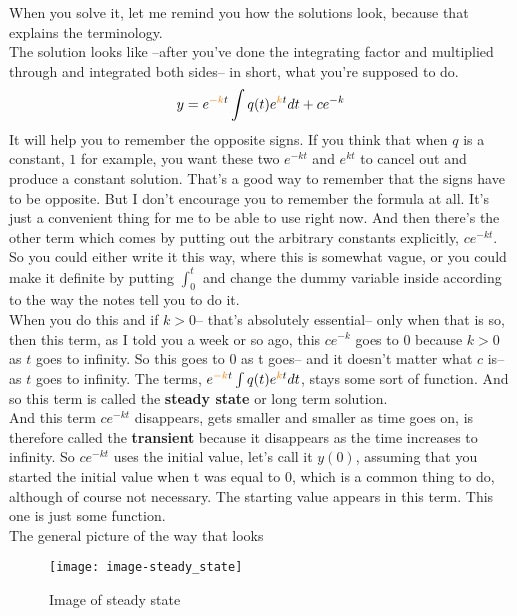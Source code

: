 When you solve it, let me remind you how the solutions look,
because that explains the terminology. \\
The solution looks like
--after you've done the integrating factor and multiplied through and integrated both sides--
in short, what you're supposed to do.
\begin{equation*}
  y = e^{{\color{orange}-k}t} \int q(t) e^{{\color{orange}k}t} dt + c e^{-k}
\end{equation*}
It will help you to remember the opposite signs.
If you think that when $q$ is a constant, $1$ for example,
you want these two $e^{-kt}$ and $e^{kt}$ to cancel out and produce a constant solution.
That's a good way to remember that the signs have to be opposite.
But I don't encourage you to remember the formula at all.
It's just a convenient thing for me to be able to use right now.
And then there's the other term which
comes by putting out the arbitrary constants explicitly, $c e^{-kt}$. 
So you could either write it this way, where this is somewhat vague, or you could
make it definite by putting $\int_0 ^t$ and change the dummy variable inside
according to the way the notes tell you to do it. \\

When you do this and if $k > 0$--
that's absolutely essential-- only when that is so, then this term, as I told you a week or so ago,
this $c e^{-k}$ goes to 0 because $k > 0$ as $t$ goes to infinity.
So this goes to 0 as t goes-- and it doesn't matter what $c$ is--as $t$ goes to infinity.
The terms, $e^{{\color{orange}-k}t} \int q(t) e^{{\color{orange}k}t} dt$, stays some sort of function.
And so this term is called the \textbf{\color{blue}steady state} or long term solution.\\

And this term $c e^{-kt}$ disappears, gets smaller and smaller as time goes on,
is therefore called the \textbf{transient} because it disappears as the time increases to infinity.
So $c e^{-kt}$ uses the initial value, let's call it $y(0)$, assuming that you started
the initial value when t was equal to $0$, which is a common thing to do, although of course
not necessary.
The starting value appears in this term. This one is just some function.\\
The general picture of the way that looks
\begin{figure}[ht!]
  \centering
  \texttt{[image: image-steady\_state]}
  \caption{Image of steady state}
\end{figure}

